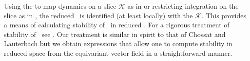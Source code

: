 


Using the {\mframes} to map dynamics on a slice $\mathcal{K}$
as in  or restricting
integration on the slice as in ,
the reduced \statesp\ is
identified (at least locally) with the {\slice}
$\mathcal{K}$. This provides a means of calculating stability
of \reqva\ in reduced \statesp. For a
rigorous treatment of stability of \reqva\ see .
Our treatment is similar in spirit
to that of Chossat and Lauterbach but we obtain
expressions that allow one to compute stability in reduced space
from the equivariant vector field in a straightforward manner.

